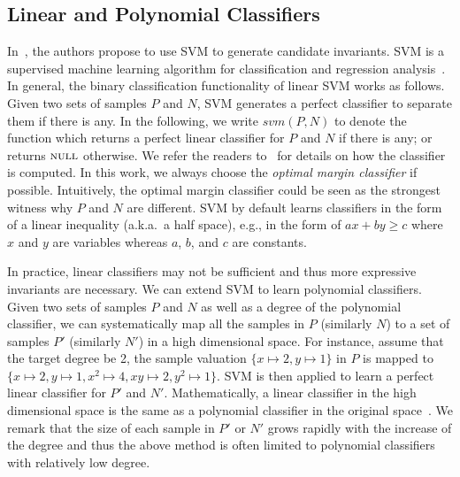\subsection{Linear and Polynomial Classifiers}
In~\cite{sharma2012interpolants}, the authors propose to use SVM to generate candidate invariants. SVM is a supervised machine learning algorithm for classification and regression analysis~\cite{svm:original}.
In general, the binary classification functionality of linear SVM works as follows. Given two sets of samples $P$ and $N$, SVM generates a perfect classifier to separate them if there is any.
In the following, we write $svm(P, N)$ to denote the function which returns a perfect linear classifier for $P$ and $N$ if there is any; or returns $\textsc{null}$ otherwise. We refer the readers to~\cite{svm:smo} for details on how the classifier is computed. In this work, we always choose the \textit{optimal margin classifier} if possible. Intuitively, the optimal margin classifier could be seen as the strongest witness why $P$ and $N$ are different.
SVM by default learns classifiers in the form of a linear inequality (a.k.a.~a half space), e.g., in the form of $a x + b y \geq c$ where $x$ and $y$ are variables whereas $a$, $b$, and $c$ are constants.

In practice, linear classifiers may not be sufficient and thus more expressive invariants are necessary. We can extend SVM to learn polynomial classifiers. Given two sets of samples $P$ and $N$ as well as a degree of the polynomial classifier, we can systematically map all the samples in $P$ (similarly $N$) to a set of samples $P'$ (similarly $N'$) in a high dimensional space. For instance, assume that the target degree be 2, the sample valuation $\{ x \mapsto 2, y \mapsto 1\}$ in $P$ is mapped to $\{x \mapsto 2, y \mapsto 1, x^2 \mapsto 4, xy \mapsto 2, y^2 \mapsto 1\}$.
SVM is then applied to learn a perfect linear classifier for $P'$ and $N'$. Mathematically, a linear classifier in the high dimensional space is the same as a polynomial classifier in the original space~\cite{svm:kernel}.
We remark that the size of each sample in $P'$ or $N'$ grows rapidly with the increase of the degree and thus the above method is often limited to polynomial classifiers with relatively low degree. 

